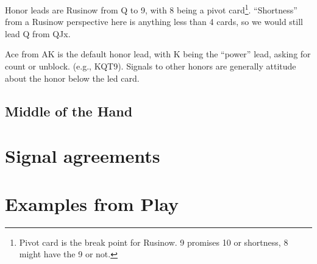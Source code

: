 \documentclass[tom-ari]{subfiles}
\begin{document}
Honor leads are Rusinow from Q to 9, with 8 being a pivot card\footnote{Pivot card is the break point for Rusinow. 9 promises 10 or shortness, 8 might have the 9 or not.}. ``Shortness'' from a Rusinow perspective here is anything less than 4 cards, so we would still lead Q from QJx.  

Ace from AK is the default honor lead, with K being the ``power'' lead, asking for count or unblock. (e.g., KQT9). Signals to other honors are generally attitude about the honor below the led card.


\section{Middle of the Hand}
\chapter{Signal agreements}
\chapter{Examples from Play}

\lipsum[4]
	
\end{document}
